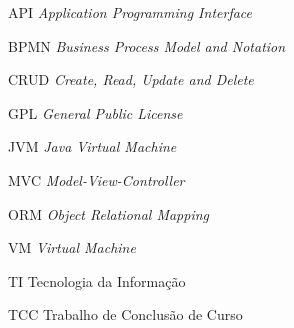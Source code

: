 \begin{siglas}
  \item[API] \textit{Application Programming Interface}
  \item[BPMN] \textit{Business Process Model and Notation}
  \item[CRUD] \textit{Create, Read, Update and Delete} 
  \item[GPL] \textit{General Public License} 
  \item[JVM] \textit{Java Virtual Machine}
  \item[MVC] \textit{Model-View-Controller}
  \item[ORM] \textit{Object Relational Mapping}
  \item[VM]  \textit{Virtual Machine}
  \item[TI]  Tecnologia da Informação
  \item[TCC] Trabalho de Conclusão de Curso
\end{siglas}

